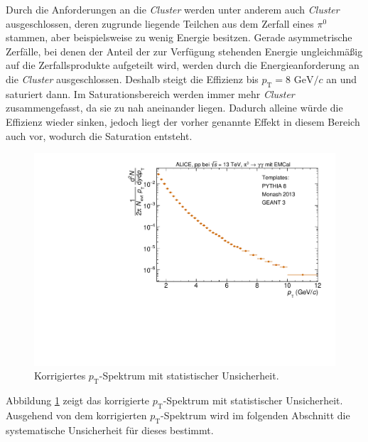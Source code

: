 \newline
Durch die Anforderungen an die \textit{Cluster} werden unter anderem auch \textit{Cluster} ausgeschlossen, deren zugrunde liegende Teilchen aus dem Zerfall eines $\pi^{0}$ stammen, aber beispielsweise zu wenig Energie besitzen.
Gerade asymmetrische Zerfälle, bei denen der Anteil der zur Verfügung stehenden Energie ungleichmäßig auf die Zerfallsprodukte aufgeteilt wird, werden durch die Energieanforderung an die \textit{Cluster} ausgeschlossen.
Deshalb steigt die Effizienz bis $p_\text{T} = 8 \text{ GeV}/c$ an und saturiert dann.
Im Saturationsbereich werden immer mehr \textit{Cluster} zusammengefasst, da sie zu nah aneinander liegen.
Dadurch alleine würde die Effizienz wieder sinken, jedoch liegt der vorher genannte Effekt in diesem Bereich auch vor, wodurch die Saturation entsteht.
\begin{figure}[t!]
\centering
\includegraphics[width=.65\linewidth]{KorrigierterYieldNurStat_Data_2016.pdf}
\caption{Korrigiertes $p_\text{T}$-Spektrum mit statistischer Unsicherheit.
}
\label{fig:YieldStatUncer}
\end{figure}
\newline
Abbildung \ref{fig:YieldStatUncer} zeigt das korrigierte $p_\text{T}$-Spektrum mit statistischer Unsicherheit.
Ausgehend von dem korrigierten $p_\text{T}$-Spektrum wird im folgenden Abschnitt die systematische Unsicherheit für dieses bestimmt.
